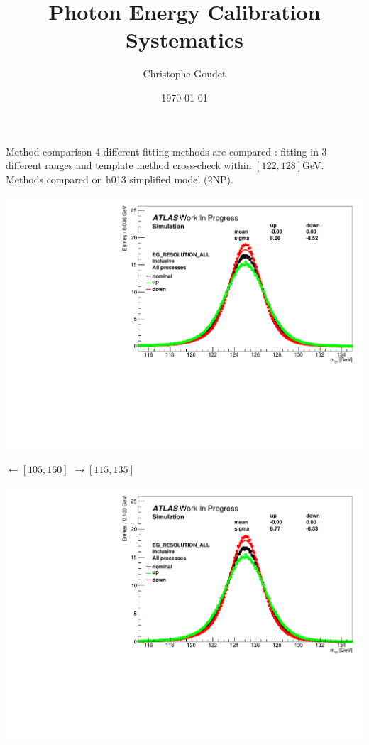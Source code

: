 \documentclass[a4paper]{beamer}
\title[$H\gamma\gamma$ couplings]{Photon Energy Calibration Systematics}
\author[Goudet]{Christophe Goudet}
\institute[LAL]{\texttt{[image: /home/goudet/Documents/LAL/ExternalPlot/LAL.jpg]} }
\date{\today}
\begin{document}
\transboxin



\begin{frame}{Method comparison}
  4 different fitting methods are compared : fitting in 3 different ranges and template method cross-check within $[122, 128]$GeV.
  Methods compared on h013 simplified model (2NP).
  
  \begin{minipage}{0.42\linewidth}
    \includegraphics[width=\linewidth]{plots/h013_EG_RESOLUTION_ALL_0_105160.pdf}
  \end{minipage}
  \hfill
  \begin{minipage}{0.14\linewidth}
    $\leftarrow [105,160]$
    $\rightarrow [115,135]$
    \end{minipage}
  \hfill
  \begin{minipage}{0.42\linewidth}
    \includegraphics[width=\linewidth]{plots/h013_EG_RESOLUTION_ALL_0_115135.pdf}

\end{minipage}
\end{frame}
\end{document}
